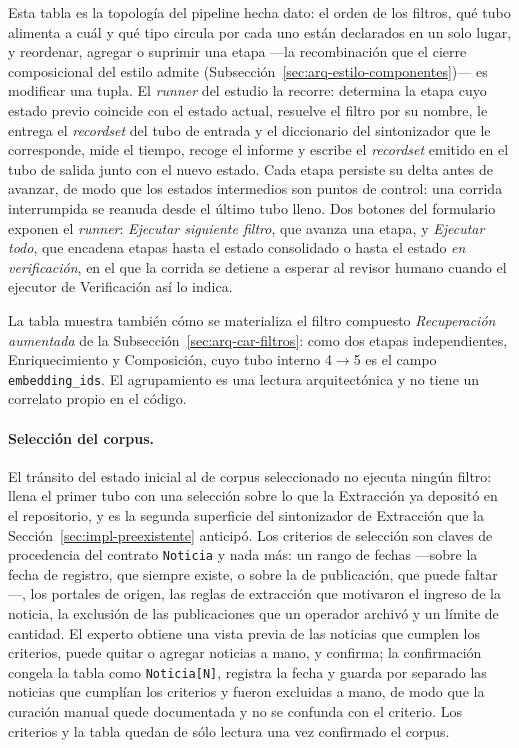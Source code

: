 \documentclass[12pt]{report}
\begin{document}
Esta tabla es la topología del pipeline hecha dato: el orden de los filtros, qué tubo alimenta a cuál y qué tipo circula por cada uno están declarados en un solo lugar, y reordenar, agregar o suprimir una etapa ---la recombinación que el cierre composicional del estilo admite (Subsección~\ref{sec:arq-estilo-componentes})--- es modificar una tupla. El \textit{runner} del estudio la recorre: determina la etapa cuyo estado previo coincide con el estado actual, resuelve el filtro por su nombre, le entrega el \textit{recordset} del tubo de entrada y el diccionario del sintonizador que le corresponde, mide el tiempo, recoge el informe y escribe el \textit{recordset} emitido en el tubo de salida junto con el nuevo estado. Cada etapa persiste su delta antes de avanzar, de modo que los estados intermedios son puntos de control: una corrida interrumpida se reanuda desde el último tubo lleno. Dos botones del formulario exponen el \textit{runner}: \textit{Ejecutar siguiente filtro}, que avanza una etapa, y \textit{Ejecutar todo}, que encadena etapas hasta el estado consolidado o hasta el estado \textit{en verificación}, en el que la corrida se detiene a esperar al revisor humano cuando el ejecutor de Verificación así lo indica.

La tabla muestra también cómo se materializa el filtro compuesto \textit{Recuperación aumentada} de la Subsección~\ref{sec:arq-car-filtros}: como dos etapas independientes, Enriquecimiento y Composición, cuyo tubo interno 4\(\to\)5 es el campo \texttt{embedding\_ids}. El agrupamiento es una lectura arquitectónica y no tiene un correlato propio en el código.

\paragraph{Selección del corpus.} El tránsito del estado inicial al de corpus seleccionado no ejecuta ningún filtro: llena el primer tubo con una selección sobre lo que la Extracción ya depositó en el repositorio, y es la segunda superficie del sintonizador de Extracción que la Sección~\ref{sec:impl-preexistente} anticipó. Los criterios de selección son claves de procedencia del contrato \texttt{Noticia} y nada más: un rango de fechas ---sobre la fecha de registro, que siempre existe, o sobre la de publicación, que puede faltar---, los portales de origen, las reglas de extracción que motivaron el ingreso de la noticia, la exclusión de las publicaciones que un operador archivó y un límite de cantidad. El experto obtiene una vista previa de las noticias que cumplen los criterios, puede quitar o agregar noticias a mano, y confirma; la confirmación congela la tabla como \texttt{Noticia[N]}, registra la fecha y guarda por separado las noticias que cumplían los criterios y fueron excluidas a mano, de modo que la curación manual quede documentada y no se confunda con el criterio. Los criterios y la tabla quedan de sólo lectura una vez confirmado el corpus.
\end{document}
